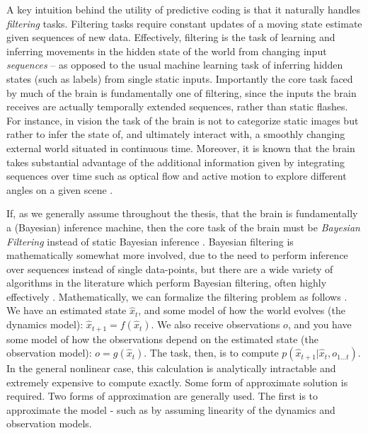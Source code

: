 A key intuition behind the utility of predictive coding is that it naturally handles \emph{filtering} tasks. Filtering tasks require constant updates of a moving state estimate given sequences of new data. Effectively, filtering is the task of learning and inferring movements in the hidden state of the world from changing input \emph{sequences} -- as opposed to the usual machine learning task of inferring hidden states (such as labels) from single static inputs. Importantly the core task faced by much of the brain is fundamentally one of filtering, since the inputs the brain receives are actually temporally extended sequences, rather than static flashes. For instance, in vision the task of the brain is not to categorize static images but rather to infer the state of, and ultimately interact with, a smoothly changing external world situated in continuous time. Moreover, it is known that the brain takes substantial advantage of the additional information given by integrating sequences over time such as optical flow \citep{gibson2002theory} and active motion to explore different angles on a given scene \citep{henderson2017gaze}.

If, as we generally assume throughout the thesis, that the brain is fundamentally a (Bayesian) inference machine, then the core task of the brain must be \emph{Bayesian Filtering} instead of static Bayesian inference \citep{sarkka2013Bayesian}. Bayesian filtering is mathematically somewhat more involved, due to the need to perform inference over sequences instead of single data-points, but there are a wide variety of algorithms in the literature which perform Bayesian filtering, often highly effectively \citep{kutschireiter2018nonlinear,kutschireiter2020hitchhiker}. Mathematically, we can formalize the filtering problem as follows \citep*{jaswinskistochastic,stengel1994optimal}. We have an estimated state $\hat{x}_t$, and some model of how the world evolves (the dynamics model): $\hat{x}_{t+1} = f(\hat{x}_t)$. We also receive observations $o$, and you have some model of how the observations depend on the estimated state (the observation model): $o = g(\hat{x}_t)$. The task, then, is to compute $p(\hat{x}_{t+1} | \hat{x}_t, o_{1...t})$. In the general nonlinear case, this calculation is analytically intractable and extremely expensive to compute exactly. Some form of approximate solution is required. Two forms of approximation are generally used. The first is to approximate the model - such as by assuming linearity of the dynamics and observation models.  

